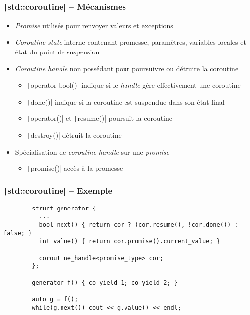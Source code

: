 \documentclass[C++.tex]{subfiles}
\begin{document}
\begin{frame}[fragile]
	\frametitle{\texttt|std::coroutine| -- Mécanismes}
	\begin{itemize}
		\item \textit{Promise} utilisée pour renvoyer valeurs et exceptions
		\item \textit{Coroutine state} interne contenant promesse, paramètres, variables locales et état du point de suspension
		\item \textit{Coroutine handle} non possédant pour poursuivre ou détruire la coroutine
		\begin{itemize}
			\item \texttt|operator bool()| indique si le \textit{handle} gère effectivement une coroutine
			\item \texttt|done()| indique si la coroutine est suspendue dans son état final
			\item \texttt|operator()| et \texttt|resume()| poursuit la coroutine
			\item \texttt|destroy()| détruit la coroutine
		\end{itemize}
		\item Spécialisation de \textit{coroutine handle} sur une \textit{promise}
		\begin{itemize}
			\item \texttt|promise()| accès à la promesse
		\end{itemize}
	\end{itemize}
\end{frame}

\begin{frame}[fragile]
	\frametitle{\texttt|std::coroutine| -- Exemple}
	\begin{verbatim}
		struct generator {
		  ...
		  bool next() { return cor ? (cor.resume(), !cor.done()) : false; }
		  int value() { return cor.promise().current_value; }

		  coroutine_handle<promise_type> cor;
		};

		generator f() { co_yield 1; co_yield 2; }

		auto g = f();
		while(g.next()) cout << g.value() << endl;
	\end{verbatim}
\end{frame}
\end{document}
